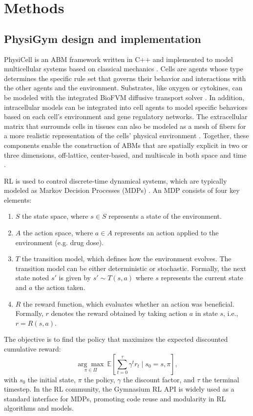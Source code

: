 \documentclass{article}
\begin{document}
\section{Methods}
\subsection{PhysiGym design and implementation}\label{sec2}
PhysiCell is an ABM framework written in C++ and implemented to model multicellular systems based on classical mechanics  \citep{ghaffarizadeh2018physicell}. Cells are agents whose type determines the specific rule set that governs their behavior and interactions with the other agents and the environment. Substrates, like oxygen or cytokines, can be modeled with the integrated BioFVM diffusive transport solver \citep{ghaffarizadeh2016biofvm}. In addition, intracellular models can be integrated into cell agents \citep{letort2018physiboss, ponce2023physiboss, ruscone2024physiboss} to model specific behaviors based on each cell's environment and gene regulatory networks. The extracellular matrix that surrounds cells in tissues can also be modeled as a mesh of fibers for a more realistic representation of the cells' physical environment \citep{noel2024physimess}. 
Together, these components enable the construction of ABMs that are spatially explicit in two or three dimensions, off-lattice, center-based, and multiscale in both space and time \citep{metzcar2019review}. 

RL is used to control discrete-time dynamical systems, which are typically modeled as Markov Decision Processes (MDPs) \citep{bellman1957markovian, puterman2014markov}. 
An MDP consists of four key elements:
\begin{enumerate}
    \item $S$ the state space, where $s\in S$ represents a state of the environment.
    \item $A$ the action space, where $a \in A$ represents an action applied to the environment (e.g. drug dose).
    \item $T$ the transition model, which defines how the environment evolves. The transition model can be either deterministic or stochastic. Formally, the next state noted $s'$ is given by $s'\sim T(s,a)$ where $s$ represents the current state and $a$ the action taken.
    \item $R$ the reward function, which evaluates whether an action was beneficial. Formally, $r$ denotes the reward obtained by taking action $a$ in state $s$, i.e., $r = R(s,a)$.
\end{enumerate}
The objective is to find the policy that maximizes the expected discounted cumulative reward:
$$
\underset{\pi\in\Pi}{\arg\max} \ \mathbb{E} \left[ \sum_{t=0}^{\tau} \gamma^t r_t \mid s_0 = s, \pi \right],
$$
with $s_0$ the initial state, $\pi$ the policy, $\gamma$ the discount factor, and $\tau$ the terminal timestep.
In the RL community, the Gymnasium RL API is widely used as a standard interface for MDPs, promoting code reuse and modularity in RL algorithms and models.
\end{document}
